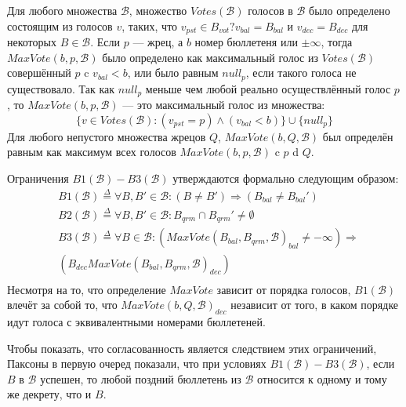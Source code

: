 \documentclass[12pt, a4paper]{article} %
\begin{document}
Для любого множества $\mathcal{B}$, множество $Votes(\mathcal{B})$ голосов в $\mathcal{B}$ было определено состоящим из голосов $v$, таких, что $v_{pst} \in B_{vot}? v_{bal} = B_{bal}$ и $v_{dec} = B_{dec}$ для некоторых $B \in \mathcal{B}$. Если $p$ --- жрец, а $b$ номер бюллетеня или $\pm \infty$, тогда $MaxVote(b, p, \mathcal{B})$ было определено как максимальный голос из $Votes(\mathcal{B})$ совершённый $p$ c $v_{bal} < b$, или было равным $null_p$, если такого голоса не существовало. Так как $null_p$ меньше чем любой реально осуществлённый голос $p$, то $MaxVote(b,p, \mathcal{B})$ --- это максимальный голос из множества:
\[  
    \{v \in Votes(\mathcal{B}) : (v_{pst} = p) \land (v_{bal} < b)\} \cup \{null_p\}
\]
Для любого непустого множества жрецов $Q$, $MaxVote(b, Q, \mathcal{B})$ был определён равным как максимум всех голосов $MaxVote(b, p, \mathcal{B})$ c $p$ d $Q$.

Ограничения  $B1(\mathcal{B}) - B3(\mathcal{B})$ утверждаются формально следующим образом:
\begin{align*}
    &B1(\mathcal{B}) \overset{\Delta}{=} \forall B, B' \in \mathcal{B} : (B \neq B') \Rightarrow (B_{bal} \neq B_{bal}') \\
    &B2(\mathcal{B}) \overset{\Delta}{=} \forall B, B' \in \mathcal{B} : B_{qrm} \cap B_{qrm}' \neq \emptyset \\
    &B3(\mathcal{B}) \overset{\Delta}{=} \forall B \in \mathcal{B} : (MaxVote(B_{bal}, B_{qrm}, \mathcal{B})_{bal} \neq - \infty) \Rightarrow \\
    &(B_{dec} MaxVote(B_{bal}, B_{qrm}, \mathcal{B})_{dec}) \\
\end{align*}
Несмотря на то, что определение $MaxVote$ зависит от порядка голосов, $B1(\mathcal{B})$ влечёт за собой то, что $MaxVote(b, Q, \mathcal{B})_{dec}$ независит от того, в каком порядке идут голоса с эквивалентными номерами бюллетеней.

Чтобы показать, что согласованность является следствием этих ограничений, Паксоны в первую очеред показали, что при условиях $B1(\mathcal{B}) - B3(\mathcal{B})$, если $B$ в $\mathcal{B}$ успешен, то любой поздний бюллетень из $\mathcal{B}$ относится к одному и тому же декрету, что и $B$.
\end{document}
